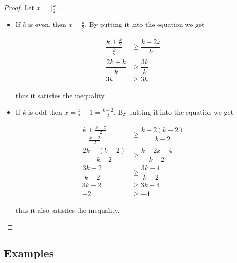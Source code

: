 \documentclass[12pt, twoside]{book}
\begin{document}
\begin{proof}
	Let $x=\lfloor\frac{k}{2}\rfloor$.
	
	\begin{itemize}
		\item If $k$ is even, then $x=\frac{k}{2}$. By putting it into the equation we get
		
		\begin{align*}
			\dfrac{k+\frac{k}{2}}{\frac{k}{2}}&\geq \dfrac{k+2k}{k} \\
			\dfrac{2k+k}{k}&\geq \dfrac{3k}{k} \\
			3k &\geq 3k
		\end{align*}
		
		thus it satisfies the inequality.
		
		\item If $k$ is odd then $x=\frac{k}{2}-1 = \frac{k-2}{2}$. By putting it into the equation we get
		
		\begin{align*}
			\dfrac{k+\frac{k-2}{2}}{\frac{k-2}{2}}&\geq \dfrac{k+2(k-2)}{k-2} \\
			\dfrac{2k+(k-2)}{k-2}&\geq \dfrac{k+2k-4}{k-2} \\
			\dfrac{3k-2}{k-2}&\geq \dfrac{3k-4}{k-2} \\
			3k-2&\geq 3k-4 \\
			-2&\geq -4
		\end{align*}
		
		thus it also satisifes the inequality.
	\end{itemize}
\end{proof}

\subsection{Examples}
\end{document}
